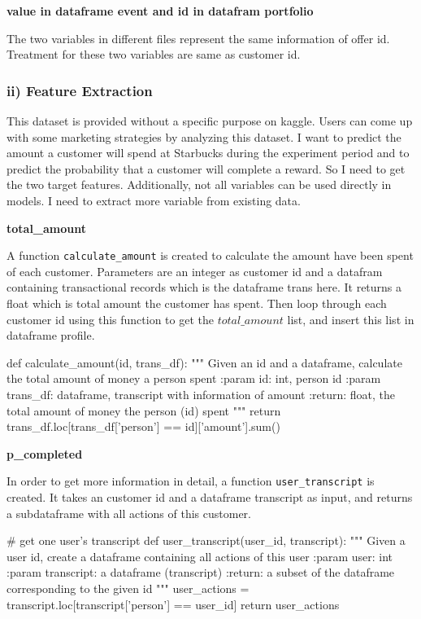 \documentclass[a4paper,12pt]{article}
\begin{document}
\textbf{value in dataframe event and id in datafram portfolio}

The two variables in different files represent the same information of offer id. Treatment for these two variables are same as 
customer id.

\subsubsection*{ii) Feature Extraction}

This dataset is provided without a specific purpose on kaggle. Users can come up with some marketing strategies by analyzing 
this dataset. I want to predict the amount a customer will spend at Starbucks during the experiment period and to predict the 
probability that a customer will complete a reward. So I need to get the two target features. Additionally, not all variables 
can be used directly in models. I need to extract more variable from existing data.

\textbf{total\_amount}

A function \texttt{calculate\_amount} is created to calculate the amount have been spent of each customer. Parameters are an 
integer as customer id and a datafram containing transactional records which is the dataframe trans here. It returns a float 
which is total amount the customer has spent. Then loop through each customer id using this function to get the $total\_amount$ 
list, and insert this list in dataframe profile. 

\begin{python}
    def calculate_amount(id, trans_df):
        """ Given an id and a dataframe, calculate the total amount of money a person spent
        :param id: int, person id
        :param trans_df: dataframe, transcript with information of amount
        :return: float, the total amount of money the person (id) spent
        """
        return trans_df.loc[trans_df['person'] == id]['amount'].sum()

\end{python}

\textbf{p\_completed}

In order to get more information in detail, a function \texttt{user\_transcript} is created. It takes an customer id and a 
dataframe transcript as input, and returns a sub\-dataframe with all actions of this customer.

\begin{python}
    # get one user's transcript
    def user_transcript(user_id, transcript):
        """ Given a user id, create a dataframe containing all actions of this user
        :param user: int
        :param transcript: a dataframe (transcript)
        :return: a subset of the dataframe corresponding to the given id
        """
        user_actions = transcript.loc[transcript['person'] == user_id]
        return user_actions
\end{python}
\end{document}
